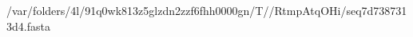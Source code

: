 \documentclass[10pt]{article}
\begin{document}
\begin{texshade}{/var/folders/4l/91q0wk813z5glzdn2zzf6fhh0000gn/T//RtmpAtqOHi/seq7d7387313d4.fasta}
\hidelogoscale
\hidenames
{}
\showlegend
\end{texshade}
\end{document}
